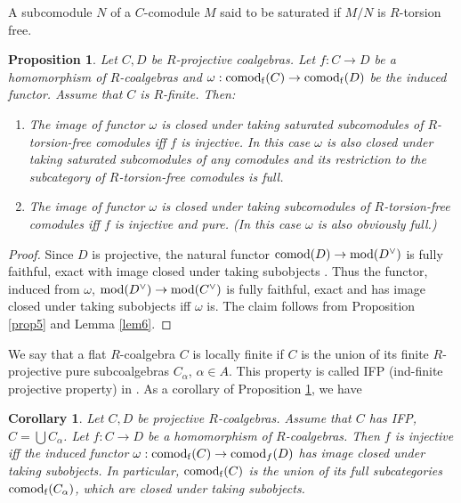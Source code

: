\documentclass[12pt]{amsart}
\theoremstyle{plain}
\newtheorem{lem}[thm]{Lemma}
\newtheorem{cor}[thm]{Corollary}
\newtheorem{prop}[thm]{Proposition}
\theoremstyle{definition}
\numberwithin{thm}{section}
\def\mod{{\rm mod}}
\def\comod{{\rm comod}}
\begin{document}
 

A subcomodule $N$ of a $C$-comodule $M$ said to be saturated if $M/N$ is $R$-torsion free.
\begin{prop}\label{prop9}
Let $C,D$ be $R$-projective coalgebras. Let 
$f:C\to D$ be a homomorphism of $R$-coalgebras and $\omega:\comod_{\rm f}(C)\to\comod_{\rm f}(D)$ be the induced functor. 
Assume that $C$ is $R$-finite.
Then:
\begin{enumerate}
\item The image of functor $\omega$ is closed 
under taking saturated subcomodules of $R$-
torsion-free comodules iff $f$ is injective. In this case $\omega$ is also closed under taking saturated subcomodules of any comodules and its restriction to the subcategory of $R$-torsion-free comodules is full.

\item  
The image of functor $\omega$ is closed 
under taking subcomodules of $R$-torsion-free 
comodules iff $f$ is injective and pure. (In 
this case $\omega$ is also obviously full.)
\end{enumerate}
\end{prop}

\begin{proof}
 Since $D$ is projective, the natural functor 
${\rm comod}(D)\to \mod(D^\vee)$ is fully faithful, exact with image closed under taking subobjects \cite[3.10]{Ha}.
Thus the functor, induced from $\omega$, $\mod(D^\vee)\to \mod(C^\vee)$ is fully faithful, exact and has image closed under taking subobjects iff $\omega$ is. The claim follows from Proposition \ref{prop5} and Lemma \ref{lem6}.
\end{proof}

We say that a flat $R$-coalgebra $C$ is locally finite if 
$C$ is the union of its finite $R$-projective pure
subcoalgebras $C_\alpha$, $\alpha\in A$. 
This property is called IFP (ind-finite projective property) in \cite{Ha}. 
As a corollary of Proposition \ref{prop9}, we have
\begin{cor} Let $C,D$ be projective $R$-coalgebras. 
Assume that $C$ has IFP, $C=\bigcup C_\alpha$. 
Let $f:C\to D$ be a homomorphism of $R$-coalgebras. 
Then $f$ is injective iff the induced functor $\omega:\comod_{\rm f}(C)\to\comod_f(D)$ has image closed under taking subobjects. 
In particular, $\comod_{\rm f}(C)$ is the union of its full 
subcategories $\comod_{\rm f}(C_\alpha)$, which are closed under taking 
subobjects.\end{cor}
\end{document}
